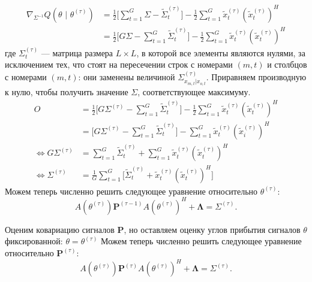 \documentclass[11pt]{article}
\begin{document}
\begin{align*}
\nabla_{\Sigma^{-1}} Q(\theta \text{ | } \theta^{(\tau)}) &= \frac{1}{2} \big[ \sum_{t = 1}^{G} \Sigma -  \widetilde{\Sigma}_{t}^{(\tau)} \big] - \frac{1}{2} \sum_{t = 1}^{G} \widetilde{x}_t^{(\tau)}(\widetilde{x}_t^{(\tau)})^H \\
&= \frac{1}{2} \big[ G \Sigma - \sum_{t = 1}^{G} \widetilde{\Sigma}_{t}^{(\tau)} \big] - \frac{1}{2} \sum_{t = 1}^{G} \widetilde{x}_t^{(\tau)}(\widetilde{x}_t^{(\tau)})^H
\end{align*}
где $\Sigma_{t}^{(\tau)}$ --- матрица размера $L \times L$, в которой все элементы являются нулями, за исключением тех, что стоят на пересечении строк с номерами $(m,t)$ и столбцов с номерами $(m,t)$: они заменены величиной $\Sigma^{(\tau)}_{x_{m,t}|x_{o,t}}$.
Приравняем производную к нулю, чтобы получить значение $\Sigma$, соответствующее максимуму.
\begin{align*}
O &= \frac{1}{2} \big[ G \Sigma^{(\tau)} - \sum_{t = 1}^{G} \widetilde{\Sigma}_{t}^{(\tau)} \big] - \frac{1}{2} \sum_{t = 1}^{G} \widetilde{x}_t^{(\tau)}(\widetilde{x}_t^{(\tau)})^H \\
&= \big[ G \Sigma^{(\tau)} - \sum_{t = 1}^{G} \widetilde{\Sigma}_{t}^{(\tau)} \big] - \sum_{t = 1}^{G} \widetilde{x}_t^{(\tau)}(\widetilde{x}_i^{(\tau)})^H \\
\iff G \Sigma^{(\tau)} &= \sum_{t = 1}^{G} \widetilde{\Sigma}_{t}^{(\tau)} + \sum_{t = 1}^{G} \widetilde{x}_t^{(\tau)}(\widetilde{x}_t^{(\tau)})^H \\
\iff \Sigma^{(\tau)} &= \frac{1}{G} \sum_{t = 1}^{G} \Big[ \widetilde{\Sigma}_{t}^{(\tau)} + \widetilde{x}_t^{(\tau)}(\widetilde{x}_t^{(\tau)})^H \Big]
\end{align*}
Можем теперь численно решить следующее уравнение относительно $\theta^{(\tau)}$:
\begin{equation}
A(\theta^{(\tau)})\mathbf{P}^{(\tau-1)}A(\theta^{(\tau)})^H + \mathbf{\Lambda} = \Sigma^{(\tau)}.
\end{equation}
\begin{center}
\fontsize{14}{18}\selectfont {}
\end{center}
Оценим ковариацию сигналов $\mathbf{P}$, но оставляем оценку углов прибытия сигналов $\theta$ фиксированной: $\theta = \theta^{(\tau)}$
Можем теперь численно решить следующее уравнение относительно $\mathbf{P}^{(\tau)}$:
\begin{equation}
A(\theta^{(\tau)})\mathbf{P}^{(\tau)}A(\theta^{(\tau)})^H + \mathbf{\Lambda} = \Sigma^{(\tau)}.
\end{equation}
\end{document}
